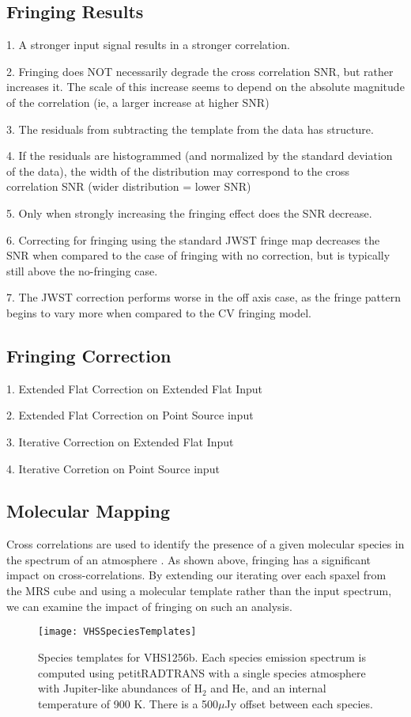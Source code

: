 \subsection{Fringing Results}
1. A stronger input signal results in a stronger correlation.

2. Fringing does NOT necessarily degrade the cross correlation SNR, but rather increases it. The scale of this increase seems to depend on the absolute magnitude of the correlation (ie, a larger increase at higher SNR)

3. The residuals from subtracting the template from the data has structure.

4. If the residuals are histogrammed (and normalized by the standard deviation of the data), the width of the distribution may correspond to the cross correlation SNR (wider distribution = lower SNR)

5. Only when strongly increasing the fringing effect does the SNR decrease.

6. Correcting for fringing using the standard JWST fringe map decreases the SNR when compared to the case of fringing with no correction, but is typically still above the no-fringing case.

7. The JWST correction performs worse in the off axis case, as the fringe pattern begins to vary more when compared to the CV fringing model.

\subsection{Fringing Correction}
1. Extended Flat Correction on Extended Flat Input

2. Extended Flat Correction on Point Source input

3. Iterative Correction on Extended Flat Input

4. Iterative Corretion on Point Source input

\subsection{Molecular Mapping}
Cross correlations are used to identify the presence of a given molecular species in the spectrum of an atmosphere \parencite{Hoeijmakers2018,Haffert2019}.
As shown above, fringing has a significant impact on cross-correlations. 
By extending our iterating over each spaxel from the MRS cube and using a molecular template rather than the input spectrum, we can examine the impact of fringing on such an analysis.
\begin{figure}[t]
	\texttt{[image: VHSSpeciesTemplates]}
	\caption{Species templates for VHS1256b. Each species emission spectrum is computed using petitRADTRANS with a single species atmosphere with Jupiter-like abundances of H$_{2}$ and He, and an internal temperature of 900 K. There is a 500$\mu$Jy offset between each species.}
	\label{fig:speciestemplates}
\end{figure}

